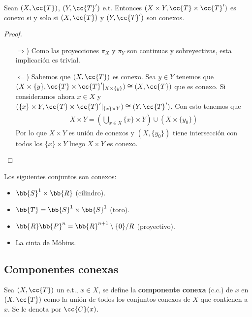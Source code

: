 \begin{prop}
    Sean $(X, \cc{T})$, $(Y, \cc{T}')$ e.t. Entonces $(X\times Y, \cc{T}\times \cc{T}')$ es conexo si y solo si $(X, \cc{T})$ y $(Y, \cc{T}')$ son conexos.
    \begin{proof}\
        \begin{itemize}
            \item[$\Rightarrow$)] Como las proyecciones $\pi_X$ y $\pi_Y$ son continuas y sobreyectivas, esta implicación es trivial.
            \item[$\Leftarrow$)] Sabemos que $(X, \cc{T})$ es conexo. Sea $y\in Y$ tenemos que $(X\times \{y\}, \cc{T}\times \cc{T}'|_{X\times\{y\}})\cong (X, \cc{T})$ que es conexo. Si consideramos ahora $x\in X$ y  $(\{x\}\times Y, \cc{T}\times \cc{T}'|_{\{x\}\times Y})\cong (Y, \cc{T}')$. Con esto tenemos que
            \begin{align*}
                X\times Y = \left(\bigcup\limits_{x\in X}\{x\}\times Y\right) \cup \left(X \times \{y_0\}\right)
            \end{align*}
            Por lo que $X\times Y$ es unión de conexos y $(X, \{y_0\})$ tiene intersección con todos los $\{x\}\times Y$ luego $X\times Y$ es conexo.

        \end{itemize}
    \end{proof}
\end{prop}

\begin{ejemplo}
    Los siguientes conjuntos son conexos:
    \begin{itemize}
        \item $\bb{S}^1 \times \bb{R}$ (cilindro).
        \item $\bb{T}=\bb{S}^1 \times \bb{S}^1$ (toro).
        \item $\bb{R}\bb{P}^n = \bb{R}^{n+1}\setminus \{0\}/R$ (proyectivo).
        \item La cinta de Möbius.
    \end{itemize}
    \endsquare
\end{ejemplo}

\subsection{Componentes conexas}
\begin{definicion}
    Sea $(X, \cc{T})$ un e.t., $x\in X$, se define la \textbf{componente conexa} (c.c.) de $x$ en $(X, \cc{T})$ como la unión de todos los conjuntos conexos de $X$ que contienen a $x$. Se le denota por $\cc{C}(x)$.
    \endsquare
\end{definicion}

